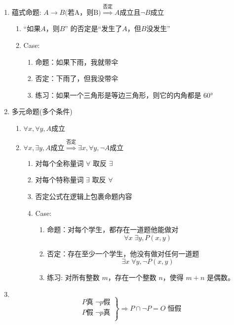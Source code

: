 \documentclass[a4paper,12pt]{article}
\begin{document}
\begin{enumerate}
\begin{enumerate}
        \end{enumerate}
        \item 蕴式命题: $A \rightarrow B \text{(若A，则B)} \overset{\text{否定}}{\Rightarrow} A\text{成立且} \neg{B}\text{成立}$
        \begin{enumerate}
            \item “如果$A$，则$B$” 的否定是“发生了$A$，但$B$没发生”
            \item Case:
            \begin{enumerate}
                \item 命题：如果下雨，我就带伞
                \item 否定：下雨了，但我没带伞
                \item 练习：如果一个三角形是等边三角形，则它的内角都是 60°
            \end{enumerate}
        \end{enumerate}
        \item 多元命题(多个条件)
        \begin{enumerate}
            \item $\forall x, \forall y, A \text{成立} $
            \item $\forall x, \exists y, A \text{成立} \overset{\text{否定}}{\Rightarrow} \exists x, \forall y, \neg{A}\text{成立}$
            \begin{enumerate}
                \item 对每个全称量词 $\forall$ 取反 \rightarrow {} \; $\exists$
                \item 对每个特称量词 $\exists$ 取反 \rightarrow {} \; $\forall$
                \item 否定公式在逻辑上包裹命题内容
                \item Case:
                \begin{enumerate}
                    \item 命题：对每个学生，都存在一道题他能做对
                    \[
                        \forall x \; \exists y, P(x, y)
                    \]
                    \item 否定：存在至少一个学生，他没有做对任何一道题
                    \[
                        \exists x \; \forall y, \neg{P(x, y)}
                    \]
                    \item 练习: 对所有整数 $m$，存在一个整数 $n$，使得 $m + n$ 是偶数。
                \end{enumerate}
            \end{enumerate}
        \end{enumerate}
        \item $$
        \[
            \left.
            \begin{array}{l}
                P\text{真} \; \neg{p} \text{假} \\
                P\text{假} \; \neg{p} \text{真} \\
            \end{array}
            \right\} \Rightarrow P \cap \neg{P} = O \; \text{恒假}
        \]
    \end{enumerate}
\end{document}
